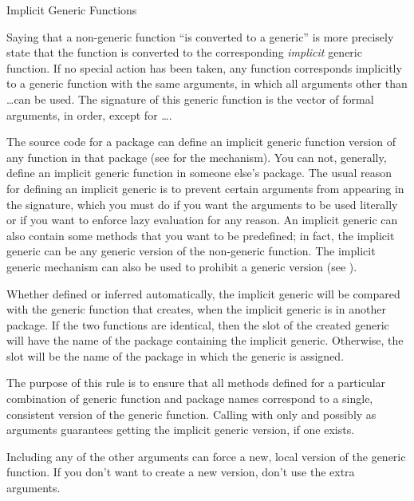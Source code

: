 \begin{Section}{Implicit Generic Functions}

Saying that a non-generic function ``is converted to a generic''
is more precisely state that the function is converted to the
corresponding \emph{implicit} generic function.
If no special action has been taken, any function corresponds
implicitly to a generic function with the same arguments, in which
all arguments
other than \dots can be used.  The signature of this generic
function is the vector of formal arguments, in order, except for
\dots.

The source code for a package can define an implicit generic function
version of any function in that package (see 
for the mechanism).  You can not, generally, define an implicit
generic function in someone else's package. The usual reason for
defining an implicit generic is to prevent certain arguments from
appearing in the signature, which you must do if you want the
arguments to be used literally or if you want to enforce lazy
evaluation for any reason.  An implicit generic can also contain some
methods that you want to be predefined; in fact, the implicit generic
can be any generic version of the non-generic function.  The implicit
generic mechanism can also be used to prohibit a generic version (see ).

Whether defined or inferred automatically, the implicit generic will
be compared with the generic function that 
creates, when the implicit generic is in another package.  If the two
functions are identical, then the  slot of the created
generic will have the name of the package containing the implicit
generic.  Otherwise, the slot will be the name of the package in which
the generic is assigned.

The purpose of this rule is to ensure that all methods defined for a
particular combination of generic function and package names
correspond to a single, consistent version of the generic
function.  Calling  with only  and
possibly  as arguments guarantees getting the implicit
generic version, if one exists.

Including any of the other arguments can force a new, local version of
the generic function.  If you don't want to create a new version,
don't use the extra arguments.
\end{Section}
%
